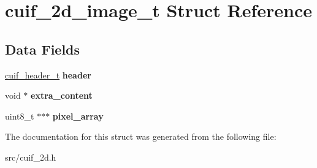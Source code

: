 \hypertarget{structcuif__2d__image__t}{\section{cuif\+\_\+2d\+\_\+image\+\_\+t Struct Reference}
\label{structcuif__2d__image__t}
}
\subsection*{Data Fields}
\begin{DoxyCompactItemize}
\item 
\hypertarget{structcuif__2d__image__t_a55fe632c3caf8b7176af62da4ced646f}{\hyperlink{structcuif__header__t}{cuif\+\_\+header\+\_\+t} {\bfseries header}}\label{structcuif__2d__image__t_a55fe632c3caf8b7176af62da4ced646f}

\item 
\hypertarget{structcuif__2d__image__t_a6122374dadfa324de71c15cf64bb1606}{void $\ast$ {\bfseries extra\+\_\+content}}\label{structcuif__2d__image__t_a6122374dadfa324de71c15cf64bb1606}

\item 
\hypertarget{structcuif__2d__image__t_a19b8bf170eb115bc7513070a5fad6305}{uint8\+\_\+t $\ast$$\ast$$\ast$ {\bfseries pixel\+\_\+array}}\label{structcuif__2d__image__t_a19b8bf170eb115bc7513070a5fad6305}

\end{DoxyCompactItemize}


The documentation for this struct was generated from the following file\+:\begin{DoxyCompactItemize}
\item 
src/cuif\+\_\+2d.\+h\end{DoxyCompactItemize}
